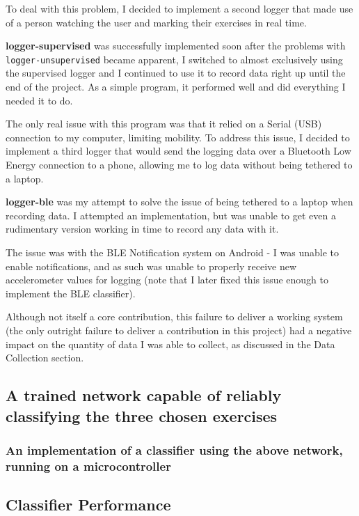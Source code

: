 \documentclass[a4paper]{article}
\begin{document}
To deal with this problem, I decided to implement a second logger that made use of a person watching the user and marking their exercises in real time.

\textbf{logger-supervised} was successfully implemented soon after the problems with \lstinline{logger-unsupervised} became apparent, I switched to almost exclusively using the supervised logger and I continued to use it to record data right up until the end of the project. As a simple program, it performed well and did everything I needed it to do.

The only real issue with this program was that it relied on a Serial (USB) connection to my computer, limiting mobility. To address this issue, I decided to implement a third logger that would send the logging data over a Bluetooth Low Energy connection to a phone, allowing me to log data without being tethered to a laptop.

\textbf{logger-ble} was my attempt to solve the issue of being tethered to a laptop when recording data. I attempted an implementation, but was unable to get even a rudimentary version working in time to record any data with it.

The issue was with the BLE Notification system on Android - I was unable to enable notifications, and as such was unable to properly receive new accelerometer values for logging (note that I later fixed this issue enough to implement the BLE classifier).

Although not itself a core contribution, this failure to deliver a working system (the only outright failure to deliver a contribution in this project) had a negative impact on the quantity of data I was able to collect, as discussed in the Data Collection section. 

\subsection{A trained network capable of reliably classifying the three chosen exercises}

\subsubsection{An implementation of a classifier using the above network, running on a microcontroller}

\subsection{Classifier Performance}%
\end{document}
